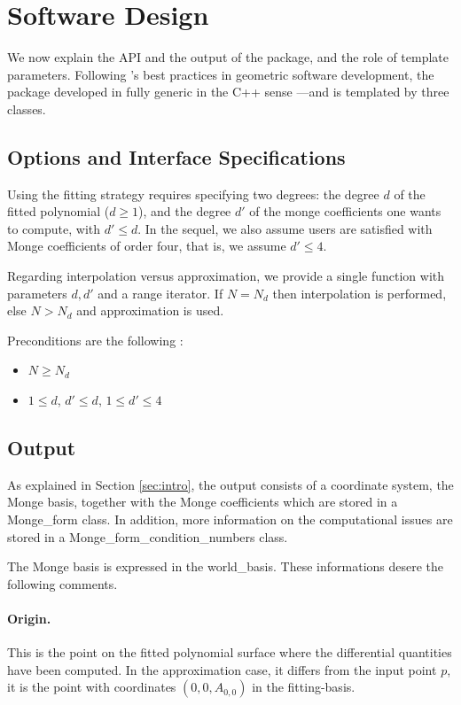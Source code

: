 \section{Software Design}

We now explain the API and the output of the package, and the role of
template parameters. Following \cgal's best practices in geometric
software development, the package developed in fully generic in the
C++ sense ---and is templated by three classes.

\subsection{Options and Interface Specifications}

Using the fitting strategy requires specifying two degrees: the degree
$d$ of the fitted polynomial ($d \geq 1$), and the degree $d'$ of the
monge coefficients one wants to compute, with $d' \leq d $.  In the sequel,
we also assume users are satisfied with Monge coefficients of order
four, that is, we assume $d' \leq 4$.
\medskip

Regarding interpolation versus approximation, we provide a single
function  with parameters $d,d'$ and a
range iterator. If $N=N_d$ then interpolation is performed, else
$N > N_d$ and approximation is used. 

Preconditions are the following :

\begin{itemize}
\item
$N \geq N_d$
\item
$1 \leq d$, $d' \leq d$, $1 \leq d' \leq 4$ 
\end{itemize}	
 
\subsection{Output}

As explained in Section \ref{sec:intro}, the output consists of a
coordinate system, the Monge basis, together with the Monge
coefficients which are stored in a Monge\_form class. In addition, more
information on the computational issues are stored in a Monge\_form\_condition\_numbers
class.

The Monge basis is expressed in the world\_basis. These informations
desere the following comments.

\paragraph{Origin.} This is the point on the fitted polynomial surface
where the differential quantities have been computed. In the
approximation case, it differs from the input point $p$, it is the
point with coordinates $(0,0,A_{0,0})$ in the fitting-basis.

